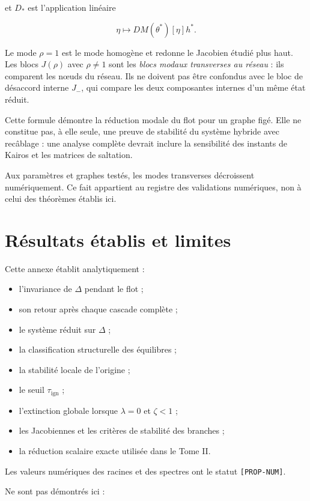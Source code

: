et \(D_\ast\) est l'application linéaire

\[
\eta
\longmapsto
DM(\theta^\ast)[\eta]h^\ast.
\]

Le mode \(\rho=1\) est le mode homogène et redonne le Jacobien étudié
plus haut. Les blocs \(J(\rho)\) avec \(\rho\neq1\) sont les
\emph{blocs modaux transverses au réseau} : ils comparent les nœuds du réseau.
Ils ne doivent pas être confondus avec le bloc de désaccord interne
\(J_-\), qui compare les deux composantes internes d'un même état réduit.

Cette formule démontre la réduction modale du flot pour un graphe
figé. Elle ne constitue pas, à elle seule, une preuve de stabilité du
système hybride avec recâblage : une analyse complète devrait inclure
la sensibilité des instants de Kairos et les matrices de saltation.

Aux paramètres et graphes testés, les modes transverses décroissent
numériquement. Ce fait appartient au registre des validations
numériques, non à celui des théorèmes établis ici.

\section{Résultats établis et limites}
\label{annexe-reduction-resultats-limites}

Cette annexe établit analytiquement :

\begin{itemize}
\item
  l'invariance de \(\Delta\) pendant le flot ;
\item
  son retour après chaque cascade complète ;
\item
  le système réduit sur \(\Delta\) ;
\item
  la classification structurelle des équilibres ;
\item
  la stabilité locale de l'origine ;
\item
  le seuil
  \(\tau_{\mathrm{ign}}\) ;
\item
  l'extinction globale lorsque \(\lambda=0\) et \(\zeta<1\) ;
\item
  les Jacobiennes et les critères de stabilité des branches ;
\item
  la réduction scalaire exacte utilisée dans le Tome II.
\end{itemize}

Les valeurs numériques des racines et des spectres ont le statut
\texttt{[PROP-NUM]}.

Ne sont pas démontrés ici :

